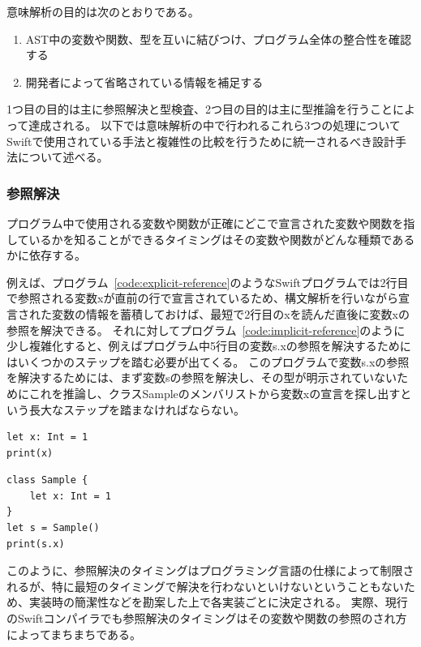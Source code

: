 意味解析の目的は次のとおりである。

\begin{enumerate}
    \item AST中の変数や関数、型を互いに結びつけ、プログラム全体の整合性を確認する
    \item 開発者によって省略されている情報を補足する
\end{enumerate}

1つ目の目的は主に参照解決と型検査、2つ目の目的は主に型推論を行うことによって達成される。
以下では意味解析の中で行われるこれら3つの処理についてSwiftで使用されている手法と複雑性の比較を行うために統一されるべき設計手法について述べる。

\subsubsection{参照解決}

プログラム中で使用される変数や関数が正確にどこで宣言された変数や関数を指しているかを知ることができるタイミングはその変数や関数がどんな種類であるかに依存する。

例えば、プログラム~\ref{code:explicit-reference}のようなSwiftプログラムでは2行目で参照される変数xが直前の行で宣言されているため、構文解析を行いながら宣言された変数の情報を蓄積しておけば、最短で2行目のxを読んだ直後に変数xの参照を解決できる。
それに対してプログラム~\ref{code:implicit-reference}のように少し複雑化すると、例えばプログラム中5行目の変数s.xの参照を解決するためにはいくつかのステップを踏む必要が出てくる。
このプログラムで変数s.xの参照を解決するためには、まず変数sの参照を解決し、その型が明示されていないためにこれを推論し、クラスSampleのメンバリストから変数xの宣言を探し出すという長大なステップを踏まなければならない。

\begin{lstlisting}[caption=直ちに変数解決が可能である例, label=code:explicit-reference]
let x: Int = 1
print(x)
\end{lstlisting}

\begin{lstlisting}[caption=変数解決までに複数の処理が必要となる例, label=code:implicit-reference]
class Sample {
    let x: Int = 1
}
let s = Sample()
print(s.x)
\end{lstlisting}

このように、参照解決のタイミングはプログラミング言語の仕様によって制限されるが、特に最短のタイミングで解決を行わないといけないということもないため、実装時の簡潔性などを勘案した上で各実装ごとに決定される。
実際、現行のSwiftコンパイラでも参照解決のタイミングはその変数や関数の参照のされ方によってまちまちである。

